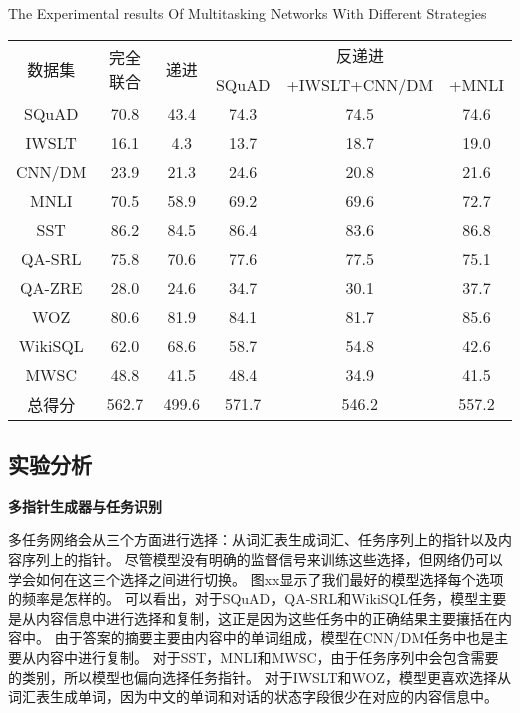 \begin{table}[!htpb]
    {The Experimental results Of Multitasking Networks With Different Strategies}
  \label{tab:drwwlzbtxlclxdsyjg}
  \centering
  \begin{threeparttable}[b]
     \begin{tabular}{cccccc}
      \toprule
      \multirow{2}{18mm}{数据集}&\multirow{2}{18mm}{完全联合}&\multirow{2}{18mm}{递进} & \multicolumn{3}{c}{反递进}\\
      \cmidrule(lr){4-6}
      & & & SQuAD & +IWSLT+CNN/DM & +MNLI\\
      \midrule
      SQuAD & 70.8 & 43.4 & 74.3 & 74.5 & 74.6\\
      IWSLT & 16.1 & 4.3 & 13.7 & 18.7 & 19.0\\
      CNN/DM & 23.9 & 21.3 & 24.6 & 20.8 & 21.6\\
      MNLI & 70.5 & 58.9 & 69.2 & 69.6 & 72.7\\
      SST & 86.2 & 84.5 & 86.4 & 83.6 & 86.8\\
      QA-SRL & 75.8 & 70.6 & 77.6 & 77.5 & 75.1\\
      QA-ZRE & 28.0 & 24.6 & 34.7 & 30.1 & 37.7\\
      WOZ & 80.6 & 81.9 & 84.1 & 81.7 & 85.6\\
      WikiSQL & 62.0 & 68.6 & 58.7 & 54.8 & 42.6\\
      MWSC & 48.8 & 41.5 & 48.4 & 34.9 & 41.5\\
      \midrule
      总得分 & 562.7 & 499.6 & 571.7 & 546.2 & 557.2\\
      \bottomrule
    \end{tabular}
  \end{threeparttable}
\end{table}

\subsection{实验分析}

\textbf{多指针生成器与任务识别}

多任务网络会从三个方面进行选择：从词汇表生成词汇、任务序列上的指针以及内容序列上的指针。
尽管模型没有明确的监督信号来训练这些选择，但网络仍可以学会如何在这三个选择之间进行切换。
图xx显示了我们最好的模型选择每个选项的频率是怎样的。
可以看出，对于SQuAD，QA-SRL和WikiSQL任务，模型主要是从内容信息中进行选择和复制，这正是因为这些任务中的正确结果主要攘括在内容中。
由于答案的摘要主要由内容中的单词组成，模型在CNN/DM任务中也是主要从内容中进行复制。
对于SST，MNLI和MWSC，由于任务序列中会包含需要的类别，所以模型也偏向选择任务指针。
对于IWSLT和WOZ，模型更喜欢选择从词汇表生成单词，因为中文的单词和对话的状态字段很少在对应的内容信息中。

